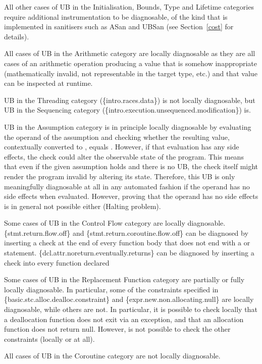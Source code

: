 All other cases of UB in the Initialisation, Bounds, Type and Lifetime categories require additional instrumentation to be diagnosable, of the kind that is implemented in sanitisers such as ASan and UBSan (see Section~\ref{cost} for details).

All cases of UB in the Arithmetic category are locally diagnosable as they are all cases of an arithmetic operation producing a value that is somehow inappropriate (mathematically invalid, not representable in the target type, etc.) and that value can be inspected at runtime.

UB in the Threading category (\{intro.races.data\}) is not locally diagnosable, but UB in the Sequencing category (\{intro.execution.unsequenced.modification\}) is. 

UB in the Assumption category is in principle locally diagnosable by evaluating the operand of the assumption and checking whether the resulting value, contextually converted to , equals . However, if that evaluation has any side effects, the check could alter the observable state of the program. This means that even if the given assumption holds and there is no UB, the check itself might render the program invalid by altering its state. Therefore, this UB is only meaningfully diagnosable at all in any automated fashion if the operand has no side effects when evaluated. However, proving that the operand has no side effects is in general not possible either (Halting problem). 

Some cases of UB in the Control Flow category are locally diagnosable. \{stmt.return.flow.off\} and \{stmt.return.coroutine.flow.off\} can be diagnosed by inserting a check at the end of every function body that does not end with a  or  statement. \{dcl.attr.noreturn.eventually.returns\} can be diagnosed by inserting a check into every function declared \tcode{[[noreturn]]}

Some cases of UB in the Replacement Function category are partially or fully locally diagnosable. In particular, some of the constraints specified in \{basic.stc.alloc.dealloc.constraint\} and \{expr.new.non.allocating.null\} are locally diagnosable, while others are not. In particular, it is possible to check locally that a deallocation function does not exit via an exception, and that an allocation function does not return null. However, is not possible to check the other constraints (locally or at all).

All cases of UB in the Coroutine category are not locally diagnosable.

